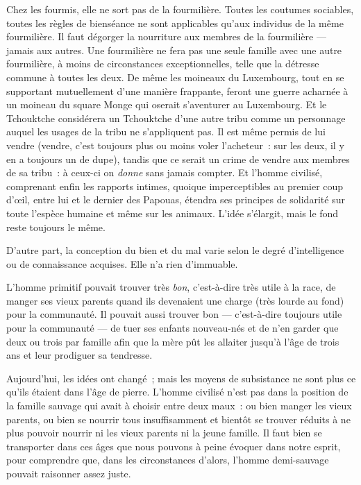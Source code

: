 \documentclass[french,twoside]{book} %
\begin{document}
Chez les fourmis, elle ne sort pas de la fourmilière. Toutes les coutumes sociables, toutes les règles de bienséance ne sont applicables qu’aux individus de la même fourmilière. Il faut dégorger la nourriture aux membres de la fourmilière — jamais aux autres. Une fourmilière ne fera pas une seule famille avec une autre fourmilière, à moins de circonstances exceptionnelles, telle que la détresse commune à toutes les deux. De même les moineaux du Luxembourg, tout en se supportant mutuellement d’une manière frappante, feront une guerre acharnée à un moineau du square Monge qui oserait s’aventurer au Luxembourg. Et le Tchouktche considérera un Tchouktche d’une autre tribu comme un personnage auquel les usages de la tribu ne s’appliquent pas. Il est même permis de lui vendre (vendre, c’est toujours plus ou moins voler l’acheteur : sur les deux, il y en a toujours un de dupe), tandis que ce serait un crime de vendre aux membres de sa tribu : à ceux-ci on \emph{donne} sans jamais compter. Et l’homme civilisé, comprenant enfin les rapports intimes, quoique imperceptibles au premier coup d’œil, entre lui et le dernier des Papouas, étendra ses principes de solidarité sur toute l’espèce humaine et même sur les animaux. L’idée s’élargit, mais le fond reste toujours le même.\par
\bigbreak
\noindent D’autre part, la conception du bien et du mal varie selon le degré d’intelligence ou de connaissance acquises. Elle n’a rien d’immuable.\par
L’homme primitif pouvait trouver très \emph{bon}, c’est-à-dire très utile à la race, de manger ses vieux parents quand ils devenaient une charge (très lourde au fond) pour la communauté. Il pouvait aussi trouver bon — c’est-à-dire toujours utile pour la communauté — de tuer ses enfants nouveau-nés et de n’en garder que deux ou trois par famille afin que la mère pût les allaiter jusqu’à l’âge de trois ans et leur prodiguer sa tendresse.\par
Aujourd’hui, les idées ont changé ; mais les moyens de subsistance ne sont plus ce qu’ils étaient dans l’âge de pierre. L’homme civilisé n’est pas dans la position de la famille sauvage qui avait à choisir entre deux maux : ou bien manger les vieux parents, ou bien se nourrir tous insuffisamment et bientôt se trouver réduits à ne plus pouvoir nourrir ni les vieux parents ni la jeune famille. Il faut bien se transporter dans  ces âges que nous pouvons à peine évoquer dans notre esprit, pour comprendre que, dans les circonstances d’alors, l’homme demi-sauvage pouvait raisonner assez juste.\par
\end{document}
